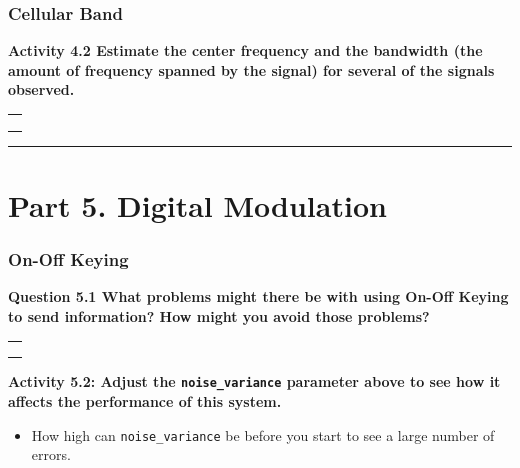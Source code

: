 \documentclass[11pt]{article}
\providecommand{\tightlist}{%
      \setlength{\itemsep}{0pt}\setlength{\parskip}{0pt}}
\begin{document}
\hypertarget{cellular-band}{%
\subsubsection*{Cellular Band}\label{cellular-band}}

\textbf{Activity 4.2 Estimate the center frequency and the bandwidth
(the amount of frequency spanned by the signal) for several of the
signals observed.}

\begin{longtable}[]{@{}l@{}}
\toprule
 \\
\midrule
\endhead
 \\
 \\
 \\
\bottomrule
\end{longtable}

    \begin{center}\rule{\linewidth}{0.5pt}\end{center}

    \hypertarget{part-5.-digital-modulation}{%
\section*{Part 5. Digital
Modulation}\label{part-5.-digital-modulation}}

    \hypertarget{on-off-keying}{%
\subsubsection*{On-Off Keying}\label{on-off-keying}}

\textbf{Question 5.1 What problems might there be with using On-Off
Keying to send information? How might you avoid those problems?}

\begin{longtable}[]{@{}l@{}}
\toprule
 \\
\midrule
\endhead
 \\
 \\
 \\
\bottomrule
\end{longtable}

    \textbf{Activity 5.2: Adjust the \texttt{noise\_variance} parameter
above to see how it affects the performance of this system.}

\begin{itemize}
\tightlist
\item
  How high can \texttt{noise\_variance} be before you start to see a
  large number of errors.
\end{itemize}
\end{document}
